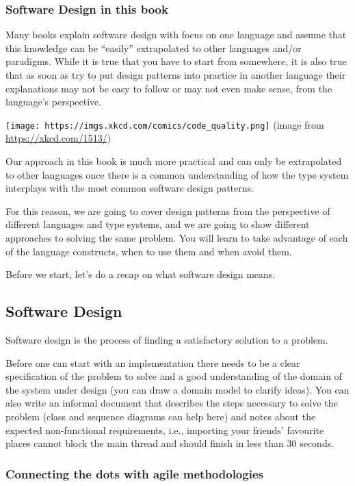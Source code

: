 \documentclass[]{article}
\begin{document}
\subsubsection{Software Design in this
book}\label{software-design-in-this-book}

Many books explain software design with focus on one language and assume
that this knowledge can be ``easily'' extrapolated to other languages
and/or paradigms. While it is true that you have to start from
somewhere, it is also true that as soon as try to put design patterns
into practice in another language their explanations may not be easy to
follow or may not even make sense, from the language's perspective.

\texttt{[image: https://imgs.xkcd.com/comics/code\_quality.png]} (image
from \url{https://xkcd.com/1513/})

Our approach in this book is much more practical and can only be
extrapolated to other languages once there is a common understanding of
how the type system interplays with the most common software design
patterns.

For this reason, we are going to cover design patterns from the
perspective of different languages and type systems, and we are going to
show different approaches to solving the same problem. You will learn to
take advantage of each of the language constructs, when to use them and
when avoid them.

Before we start, let's do a recap on what software design means.

\subsection{Software Design}\label{software-design}

Software design is the process of finding a satisfactory solution to a
problem.

Before one can start with an implementation there needs to be a clear
specification of the problem to solve and a good understanding of the
domain of the system under design (you can draw a domain model to
clarify ideas). You can also write an informal document that describes
the steps necessary to solve the problem (class and sequence diagrams
can help here) and notes about the expected non-functional requirements,
i.e., importing your friends' favourite places cannot block the main
thread and should finish in less than 30 seconds.

\subsubsection{Connecting the dots with agile
methodologies}\label{connecting-the-dots-with-agile-methodologies}
\end{document}
